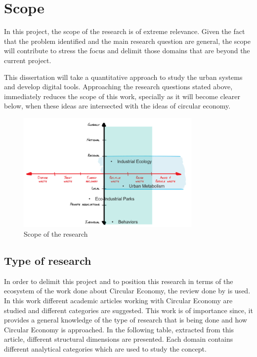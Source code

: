 \chapter{Scope}
In this project, the scope of the research is of extreme relevance. Given the fact that the problem identified and the main research question are general, the scope will contribute to stress the focus and delimit those domains that are beyond the current project.\par
This dissertation will take a quantitative approach to study the urban systems and develop digital tools. Approaching the research questions stated above, immediately reduces the scope of this work, specially as it will become clearer below, when these ideas are intersected with the ideas of circular economy.\par



\begin{figure}[h!]
    \centering
    \includegraphics[width=0.8\textwidth]{sections/asset/scopeee.PNG}
    \caption{Scope of the research}
    \label{fig:scope}
\end{figure}



\section{Type of research}
In order to delimit this project and to position this research in terms of the ecosystem of the work done about Circular Economy, the review done by \textcite{Merli2018} is used. In this work different academic articles working with Circular Economy are studied and different categories are suggested. This work is of importance since, it provides a general knowledge of the type of research that is being done and how Circular Economy is approached. In the following table, extracted from this article, different structural dimensions are presented. Each domain contains different analytical categories which are used to study the concept. 

